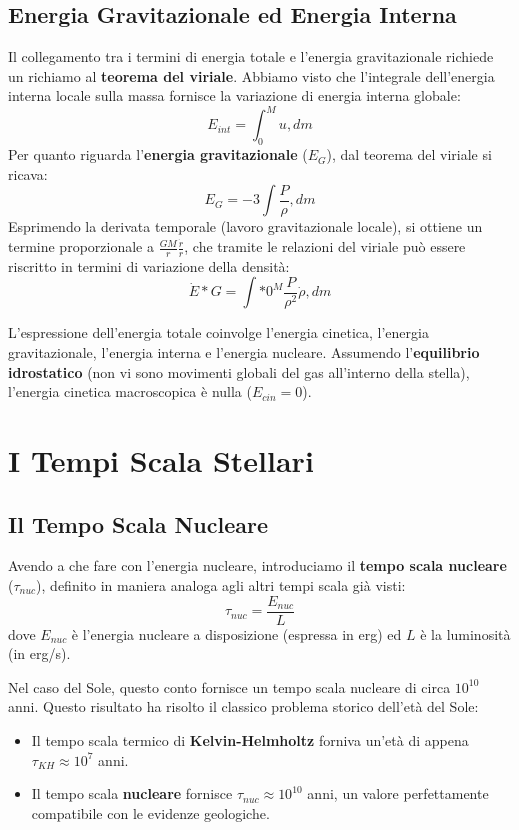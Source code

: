\subsection{Energia Gravitazionale ed Energia Interna}

Il collegamento tra i termini di energia totale e l'energia gravitazionale richiede un richiamo al \textbf{teorema del viriale}. Abbiamo visto che l'integrale dell'energia interna locale sulla massa fornisce la variazione di energia interna globale:
\begin{equation}
E_{int} = \int_{0}^{M} u , dm
\end{equation}
Per quanto riguarda l'\textbf{energia gravitazionale} ($E_G$), dal teorema del viriale si ricava:
\begin{equation}
E_G = -3 \int \frac{P}{\rho} , dm
\end{equation}
Esprimendo la derivata temporale (lavoro gravitazionale locale), si ottiene un termine proporzionale a $\frac{GM}{r} \frac{\dot{r}}{r}$, che tramite le relazioni del viriale può essere riscritto in termini di variazione della densità:
\begin{equation}
\dot{E}*G = \int*{0}^{M} \frac{P}{\rho^2} \dot{\rho} , dm
\end{equation}

L'espressione dell'energia totale coinvolge l'energia cinetica, l'energia gravitazionale, l'energia interna e l'energia nucleare. Assumendo l'\textbf{equilibrio idrostatico} (non vi sono movimenti globali del gas all'interno della stella), l'energia cinetica macroscopica è nulla ($E_{cin} = 0$).

\section{I Tempi Scala Stellari}

\subsection{Il Tempo Scala Nucleare}
Avendo a che fare con l'energia nucleare, introduciamo il \textbf{tempo scala nucleare} ($\tau_{nuc}$), definito in maniera analoga agli altri tempi scala già visti:
\begin{equation}
\tau_{nuc} = \frac{E_{nuc}}{L}
\end{equation}
dove $E_{nuc}$ è l'energia nucleare a disposizione (espressa in erg) ed $L$ è la luminosità (in erg/s).

Nel caso del Sole, questo conto fornisce un tempo scala nucleare di circa $10^{10}$ anni. Questo risultato ha risolto il classico problema storico dell'età del Sole:
\begin{itemize}
\item Il tempo scala termico di \textbf{Kelvin-Helmholtz} forniva un'età di appena $\tau_{KH} \approx 10^7$ anni.
\item Il tempo scala \textbf{nucleare} fornisce $\tau_{nuc} \approx 10^{10}$ anni, un valore perfettamente compatibile con le evidenze geologiche.
\end{itemize}

